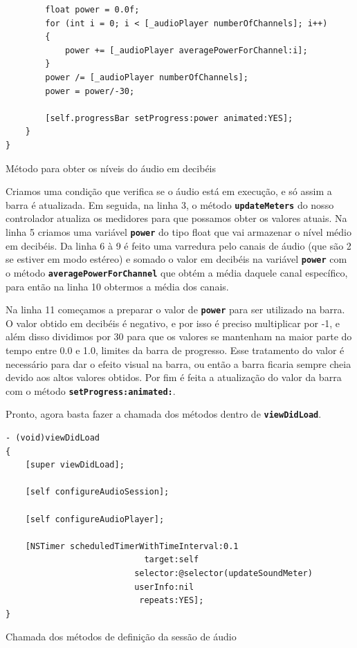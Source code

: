\documentclass[a4paper,12pt,brazil,doubleside]{book}
\begin{document}
\begin{singlespace}
\begin{listing}[H]
\begin{verbatim}
        float power = 0.0f;
        for (int i = 0; i < [_audioPlayer numberOfChannels]; i++)
        {
            power += [_audioPlayer averagePowerForChannel:i];
        }
        power /= [_audioPlayer numberOfChannels];
        power = power/-30;
        
        [self.progressBar setProgress:power animated:YES];
    }
}
\end{verbatim}
\caption{Método para obter os níveis do áudio em decibéis}
\end{listing}


Criamos uma condição que verifica se o áudio está em execução, e só assim a barra é atualizada. Em seguida, na linha 3, o método \texttt{\textbf{updateMeters}} do nosso controlador atualiza os medidores para que possamos obter os valores atuais. Na linha 5 criamos uma variável \texttt{\textbf{power}} do tipo float que vai armazenar o nível médio em decibéis. Da linha 6 à 9 é feito uma varredura pelo canais de áudio (que são 2 se estiver em modo estéreo) e somado o valor em decibéis na variável \texttt{\textbf{power}} com o método \texttt{\textbf{averagePowerForChannel}} que obtém a média daquele canal específico, para então na linha 10 obtermos a média dos canais.

Na linha 11 começamos a preparar o valor de \texttt{\textbf{power}} para ser utilizado na barra. O valor obtido em decibéis é negativo, e por isso é preciso multiplicar por -1, e além disso dividimos por 30 para que os valores se mantenham na maior parte do tempo entre 0.0 e 1.0, limites da barra de progresso. Esse tratamento do valor é necessário para dar o efeito visual na barra, ou então a barra ficaria sempre cheia devido aos altos valores obtidos. Por fim é feita a atualização do valor da barra com o método \texttt{\textbf{setProgress:animated:}}.

Pronto, agora basta fazer a chamada dos métodos dentro de \texttt{\textbf{viewDidLoad}}.

\begin{listing}[H]
\begin{verbatim}
- (void)viewDidLoad
{
    [super viewDidLoad];
    
    [self configureAudioSession];
    
    [self configureAudioPlayer];
    
    [NSTimer scheduledTimerWithTimeInterval:0.1
                            target:self
                          selector:@selector(updateSoundMeter)
                          userInfo:nil
                           repeats:YES];
}
\end{verbatim}
\caption{Chamada dos métodos de definição da sessão de áudio}
\end{listing}



\end{singlespace}
\end{document}
